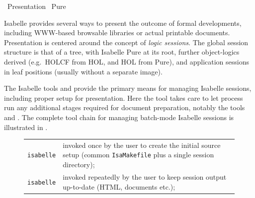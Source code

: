 %
\begin{isabellebody}%
\def\isabellecontext{Presentation}%
%
\isadelimtheory
%
\endisadelimtheory
%
\isatagtheory
{}\isamarkupfalse%
\ Presentation\isanewline
{}\ Pure\isanewline
{}%
\endisatagtheory
{\isafoldtheory}%
%
\isadelimtheory
%
\endisadelimtheory
%
\isamarkuptrue%
%
\begin{isamarkuptext}%
Isabelle provides several ways to present the outcome of formal
  developments, including WWW-based browsable libraries or actual
  printable documents.  Presentation is centered around the concept of
  \emph{logic sessions}.  The global session structure is that of a
  tree, with Isabelle Pure at its root, further object-logics derived
  (e.g.\ HOLCF from HOL, and HOL from Pure), and application sessions
  in leaf positions (usually without a separate image).

  The Isabelle tools \hyperlink{tool.mkdir}{\mbox{}} and \hyperlink{tool.make}{\mbox{}} provide
  the primary means for managing Isabelle sessions, including proper
  setup for presentation.  Here the \hyperlink{tool.usedir}{\mbox{}} tool takes care
  to let \hyperlink{executable.isabelle-process}{\mbox{}} process run any
  additional stages required for document preparation, notably the
  tools \hyperlink{tool.document}{\mbox{}} and \hyperlink{tool.latex}{\mbox{}}.  The complete tool
  chain for managing batch-mode Isabelle sessions is illustrated in
  .

  \begin{figure}[htbp]
  \begin{center}
  \begin{tabular}{lp{}}

      \verb|isabelle| \indexref{}{tool}{mkdir}\hyperlink{tool.mkdir}{\mbox{\isa{\isatt{mkdir}}}} & invoked once by the user
      to create the initial source setup (common \verb|IsaMakefile| plus a single session directory); \\

      \verb|isabelle| \hyperlink{tool.make}{\mbox{\isa{\isatt{make}}}} & invoked repeatedly by the
      user to keep session output up-to-date (HTML, documents etc.); \\


\end{tabular}
\end{center}
\end{figure}
\end{isamarkuptext}
\end{isabellebody}
